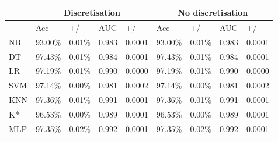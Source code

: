 \begin{table}[htbp]
\caption{}
\begin{tabular}{|l|r|r|r|r|r|r|r|r|}
\hline
 & \multicolumn{ 4}{c|}{Discretisation} & \multicolumn{ 4}{c|}{No discretisation} \\ \hline
 & \multicolumn{1}{l|}{Acc} & \multicolumn{1}{l|}{+/-} & \multicolumn{1}{l|}{AUC} & \multicolumn{1}{l|}{+/-} & \multicolumn{1}{l|}{Acc} & \multicolumn{1}{l|}{+/-} & \multicolumn{1}{l|}{AUC} & \multicolumn{1}{l|}{+/-} \\ \hline
NB & 93.00\% & 0.01\% & 0.983 & 0.0001 & 93.00\% & 0.01\% & 0.983 & 0.0001 \\ \hline
DT & 97.43\% & 0.01\% & 0.984 & 0.0001 & 97.43\% & 0.01\% & 0.984 & 0.0001 \\ \hline
LR & 97.19\% & 0.01\% & 0.990 & 0.0000 & 97.19\% & 0.01\% & 0.990 & 0.0000 \\ \hline
SVM & 97.14\% & 0.00\% & 0.981 & 0.0002 & 97.14\% & 0.00\% & 0.981 & 0.0002 \\ \hline
KNN & 97.36\% & 0.01\% & 0.991 & 0.0001 & 97.36\% & 0.01\% & 0.991 & 0.0001 \\ \hline
K* & 96.53\% & 0.00\% & 0.989 & 0.0001 & 96.53\% & 0.00\% & 0.989 & 0.0001 \\ \hline
MLP & 97.35\% & 0.02\% & 0.992 & 0.0001 & 97.35\% & 0.02\% & 0.992 & 0.0001 \\ \hline
\end{tabular}
\label{}
\end{table}
